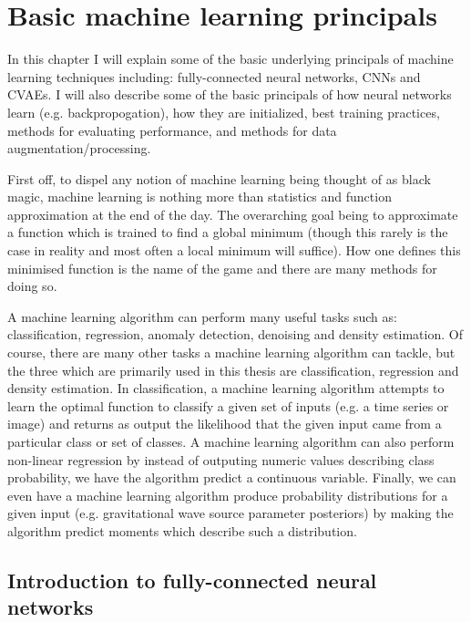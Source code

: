\chapter{Basic machine learning principals}

%
%
In this chapter I will explain some of the basic underlying
principals of machine learning techniques including: 
fully-connected neural networks, \ac{CNN}s 
and \ac{CVAE}s. I will also 
describe some of the basic principals of how neural networks 
learn (e.g. backpropogation), how they are initialized, 
best training practices, methods for evaluating performance, 
and methods for data augmentation/processing.

First off, to dispel any notion of machine learning being 
thought of as black magic, machine learning is nothing more 
than statistics and function approximation at the end of 
the day. The overarching goal being to approximate a 
function which is trained to find a global minimum 
(though this rarely is the case in reality and most 
often a local minimum will suffice). How one defines 
this minimised function is the name of the game and there 
are many methods for doing so. 

A machine learning algorithm can perform many useful tasks 
such as: classification, regression, anomaly 
detection, denoising and density estimation. Of course, 
there are many other tasks a machine learning algorithm 
can tackle, but the three which are primarily used in this 
thesis are classification, regression and density estimation.
In classification, a machine learning algorithm attempts 
to learn the optimal function to classify a given set 
of inputs (e.g. a time series or image) and returns as 
output the likelihood that the given input came from a 
particular class or set of 
classes. A machine learning algorithm can also perform 
non-linear regression by instead of outputing numeric 
values describing class probability, we have the algorithm 
predict a continuous variable. Finally, we can even have a machine learning 
algorithm produce probability distributions for a given 
input (e.g. gravitational wave source parameter posteriors) by 
making the algorithm predict moments which describe 
such a distribution. 

\section{Introduction to fully-connected neural networks}

